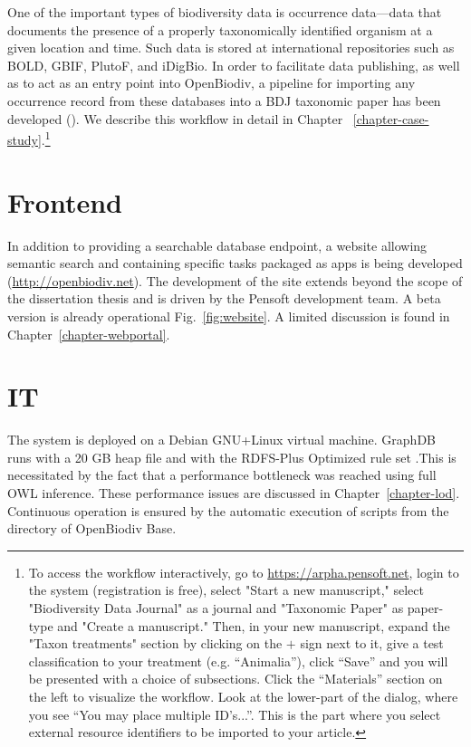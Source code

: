 One of the important types of biodiversity data is occurrence data---data that documents the presence of a properly taxonomically identified organism at a given location and time. Such data is stored at international repositories such as BOLD, GBIF, PlutoF, and iDigBio. In order to facilitate data publishing, as well as to act as an entry point into OpenBiodiv, a pipeline for importing any occurrence record from these databases into a BDJ taxonomic paper has been developed (\cite{senderov_online_2016}). We describe this workflow in detail in Chapter ~\ref{chapter-case-study}.\footnote{To access the workflow interactively, go to \url{https://arpha.pensoft.net}, login to the system (registration is free), select "Start a new manuscript," select "Biodiversity Data Journal" as a journal and "Taxonomic Paper" as paper-type and "Create a manuscript." Then, in your new manuscript, expand the "Taxon treatments" section by clicking on the $+$ sign next to it, give a test classification to your treatment (e.g. ``Animalia''), click ``Save'' and you will be presented with a choice of subsections. Click the ``Materials'' section on the left to visualize the workflow. Look at the lower-part of the dialog, where you see ``You may place multiple ID's...''. This is the part where you select external resource identifiers to be imported to your article.}

\section{Frontend}

In addition to providing a searchable database endpoint, a website allowing semantic search and containing specific tasks packaged as apps is being developed (\url{http://openbiodiv.net}). The development of the site extends beyond the scope of the dissertation thesis and is driven by the Pensoft development team. A beta version is already operational Fig.~\ref{fig:website}. A limited discussion is found in Chapter~\ref{chapter-webportal}.

\section{IT}

The system is deployed on a Debian GNU+Linux virtual machine. GraphDB runs with a 20 GB heap file and with the RDFS-Plus Optimized rule set .This is necessitated by the fact that a performance bottleneck was reached using full OWL inference. These performance issues are discussed in Chapter~\ref{chapter-lod}.  Continuous operation is ensured by the automatic execution of scripts from the  directory of OpenBiodiv Base.

